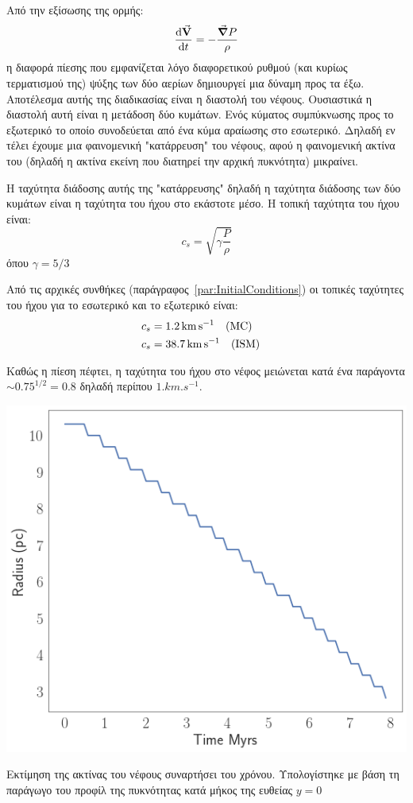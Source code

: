 \documentclass[article,a4paper,11.2pt]{memoir}
\numberwithin{equation}{subsection}
\begin{document}
	 Από την εξίσωσης της ορμής:
	\begin{equation}
	\dv{\va V}{t}=-\frac{\grad P}{\rho}
	\end{equation}
	η διαφορά πίεσης που εμφανίζεται λόγο διαφορετικού ρυθμού (και κυρίως τερματισμού της) ψύξης των δύο αερίων δημιουργεί μια δύναμη προς τα έξω. Αποτέλεσμα αυτής της διαδικασίας είναι η διαστολή του νέφους. Ουσιαστικά η διαστολή αυτή είναι η μετάδοση δύο κυμάτων. Ενός κύματος συμπύκνωσης προς το εξωτερικό το οποίο συνοδεύεται από ένα κύμα αραίωσης στο εσωτερικό. Δηλαδή εν τέλει έχουμε μια φαινομενική "κατάρρευση" του νέφους, αφού η φαινομενική ακτίνα του (δηλαδή η ακτίνα εκείνη που διατηρεί την αρχική πυκνότητα) μικραίνει.
	 
	Η ταχύτητα διάδοσης αυτής της "κατάρρευσης" δηλαδή η ταχύτητα διάδοσης των δύο κυμάτων είναι η ταχύτητα του ήχου στο εκάστοτε μέσο. Η τοπική ταχύτητα του ήχου είναι:
	\begin{equation}
	c_s=\sqrt{\gamma \frac{P}{\rho}}
	\end{equation}
	όπου $\gamma = 5/3$
	
	
	Από τις αρχικές συνθήκες (παράγραφος~\ref{par:InitialConditions}) οι τοπικές ταχύτητες του ήχου για το εσωτερικό και το εξωτερικό είναι:
	\begin{align}
	c_s &=\SI{1.2}{km.s^{-1}} \qq{(MC)} \\
	c_s &=\SI{38.7}{km.s^{-1}} \qq{(ISM)}
	\end{align}
	
	Καθώς η πίεση πέφτει, η ταχύτητα του ήχου στο νέφος μειώνεται κατά ένα παράγοντα $\sim 0.75^{1/2}=0.8$ δηλαδή περίπου $1\si{.km.s^{-1}}$.
	
	\begin{marginfigure}
		\includegraphics[width=1\linewidth]{DataImages/TabCoolingRadius}
		\caption{Εκτίμηση της ακτίνας του νέφους συναρτήσει του χρόνου. Υπολογίστηκε με βάση τη παράγωγο του προφίλ της πυκνότητας κατά μήκος της ευθείας $y=0$}
		\label{fig:tabcoolingradius}
	\end{marginfigure}
	
\end{document}
